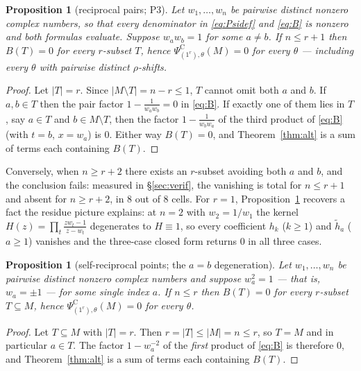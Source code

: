 \documentclass[11pt]{article}
\newtheorem{proposition}[theorem]{Proposition}
\theoremstyle{definition}
\newcommand{\PsiC}{\Psi^{\mathrm{C}}}
\begin{document}
\begin{proposition}[reciprocal pairs; P3]\label{prop:recip}
Let $w_1,\dots,w_n$ be pairwise distinct nonzero complex numbers, so that every denominator
in \eqref{eq:Psidef} and \eqref{eq:B} is nonzero and both formulas evaluate. Suppose
$w_aw_b=1$ for some $a\ne b$. If $n\le r+1$ then $B(T)=0$ for \emph{every} $r$-subset $T$,
hence $\PsiC_{(1^r),\theta}(M)=0$ for \emph{every} $\theta$ --- including every $\theta$
with pairwise distinct $\rho$-shifts.
\end{proposition}

\begin{proof}
Let $|T|=r$. Since $|M\setminus T|=n-r\le1$, $T$ cannot omit both $a$ and $b$.
If $a,b\in T$ then the pair factor $1-\frac{1}{w_aw_b}=0$ in \eqref{eq:B}. If exactly one
of them lies in $T$, say $a\in T$ and $b\in M\setminus T$, then the factor
$1-\frac{1}{w_bw_a}$ of the third product of \eqref{eq:B} (with $t=b$, $x=w_a$) is $0$.
Either way $B(T)=0$, and Theorem~\ref{thm:alt} is a sum of terms each containing $B(T)$.
\end{proof}

\noindent Conversely, when $n\ge r+2$ there exists an $r$-subset avoiding both $a$ and $b$,
and the conclusion fails: measured in \S\ref{sec:verif}, the vanishing is total for
$n\le r+1$ and absent for $n\ge r+2$, in $8$ out of $8$ cells. For $r=1$,
Proposition~\ref{prop:recip} recovers a fact the residue picture explains: at $n=2$ with
$w_2=1/w_1$ the kernel $H(z)=\prod_t\frac{zw_t-1}{z-w_t}$ degenerates to $H\equiv1$, so
every coefficient $h_k$ ($k\ge1$) and $\tilde h_a$ ($a\ge1$) vanishes and the three-case
closed form returns $0$ in all three cases.

\begin{proposition}[self-reciprocal points; the $a=b$ degeneration]\label{prop:selfrecip}
Let $w_1,\dots,w_n$ be pairwise distinct nonzero complex numbers and suppose $w_a^2=1$
--- that is, $w_a=\pm1$ --- for some single index $a$. If $n\le r$ then $B(T)=0$ for
\emph{every} $r$-subset $T\subseteq M$, hence $\PsiC_{(1^r),\theta}(M)=0$ for \emph{every}
$\theta$.
\end{proposition}

\begin{proof}
Let $T\subseteq M$ with $|T|=r$. Then $r=|T|\le|M|=n\le r$, so $T=M$ and in particular
$a\in T$. The factor $1-w_a^{-2}$ of the \emph{first} product of \eqref{eq:B} is therefore
$0$, and Theorem~\ref{thm:alt} is a sum of terms each containing $B(T)$.
\end{proof}
\end{document}
